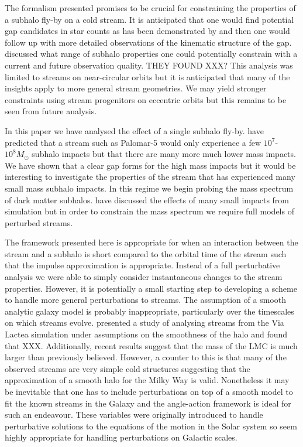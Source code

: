 \documentclass[useAMS,usenatbib,fleqn,a4paper]{mn2e}
\begin{document}
The formalism presented promises to be crucial for constraining the properties of a subhalo fly-by on a cold stream. It is anticipated that one would find potential gap candidates in star counts as has been demonstrated by \cite{Carlberg2013} and then one would follow up with more detailed observations of the kinematic structure of the gap. \cite{ErkalBelokurov2015b} discussed what range of subhalo properties one could potentially constrain with a current and future observation quality. THEY FOUND XXX? This analysis was limited to streams on near-circular orbits but it is anticipated that many of the insights apply to more general stream geometries. We may yield stronger constraints using stream progenitors on eccentric orbits but this remains to be seen from future analysis.

In this paper we have analysed the effect of a single subhalo fly-by. \cite{YoonJohnstonHogg} have predicted that a stream such as Palomar-5 would only experience a few $10^7$-$10^8M_\odot$ subhalo impacts but that there are many more much lower mass impacts. We have shown that a clear gap forms for the high mass impacts but it would be interesting to investigate the properties of the stream that has experienced many small mass subhalo impacts. In this regime we begin probing the mass spectrum of dark matter subhalos. \cite{Carlberg2013} \cite{NganCarlberg2014} have discussed the effects of many small impacts from simulation but in order to constrain the mass spectrum we require full models of perturbed streams.

The framework presented here is appropriate for when an interaction between the stream and a subhalo is short compared to the orbital time of the stream such that the impulse approximation is appropriate. Instead of a full perturbative analysis we were able to simply consider instantaneous changes to the stream properties. However, it is potentially a small starting step to developing a scheme to handle more general perturbations to streams. The assumption of a smooth analytic galaxy model is probably inappropriate, particularly over the timescales on which streams evolve. \cite{Bonaca2014} presented a study of analysing streams from the Via Lactea simulation under assumptions on the smoothness of the halo and found that XXX. Additionally, recent results suggest that the mass of the LMC is much larger than previously believed. However, a counter to this is that many of the observed streams are very simple cold structures suggesting that the approximation of a smooth halo for the Milky Way is valid. Nonetheless it may be inevitable that one has to include perturbations on top of a smooth model to fit the known streams in the Galaxy and the angle-action framework is ideal for such an endeavour. These variables were originally introduced to handle perturbative solutions to the equations of the motion in the Solar system so seem highly appropriate for handling perturbations on Galactic scales.
\end{document}

